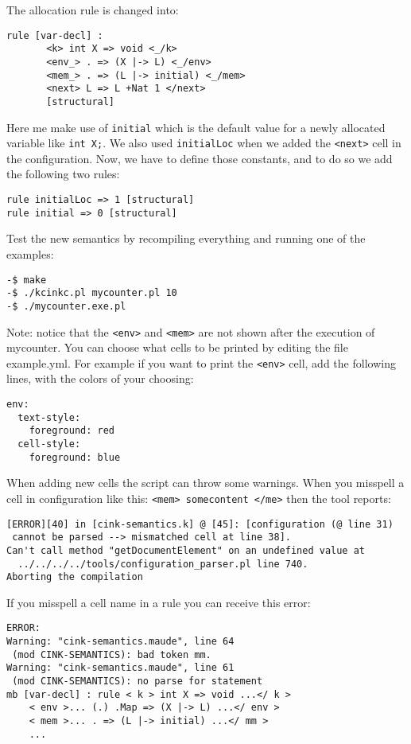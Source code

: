 \documentclass[11pt,a4paper]{article}
\begin{document}
\noindent The allocation rule is changed into:

\begin{verbatim}
rule [var-decl] :
       <k> int X => void <_/k>
       <env_> . => (X |-> L) <_/env>
       <mem_> . => (L |-> initial) <_/mem>
       <next> L => L +Nat 1 </next>
       [structural]
\end{verbatim}

\noindent Here me make use of \verb^initial^ which is the default value for a newly allocated variable like \verb^int X;^. We also used \verb^initialLoc^ when we added the \verb^<next>^ cell in the configuration. Now, we have to define those constants, and to do so we add the following two rules: 

\begin{verbatim}
rule initialLoc => 1 [structural]                                             
rule initial => 0 [structural] 
\end{verbatim}

Test the new semantics by recompiling everything and running one of the examples:

\begin{verbatim}
-$ make
-$ ./kcinkc.pl mycounter.pl 10
-$ ./mycounter.exe.pl
\end{verbatim}

Note: notice that the \verb^<env>^ and \verb^<mem>^ are not shown after the execution of mycounter. You can choose what cells to be printed by editing the file example.yml. For example if you want to print the \verb^<env>^ cell, add the following lines, with the colors of your choosing:

\begin{verbatim}
env:
  text-style:
    foreground: red
  cell-style:
    foreground: blue
\end{verbatim}

When adding new cells the script can throw some warnings. When you misspell a cell in configuration like this: \verb^<mem> somecontent </me>^ then the tool reports:

\begin{verbatim}
[ERROR][40] in [cink-semantics.k] @ [45]: [configuration (@ line 31)
 cannot be parsed --> mismatched cell at line 38].
Can't call method "getDocumentElement" on an undefined value at
  ../../../../tools/configuration_parser.pl line 740.
Aborting the compilation
\end{verbatim}

\noindent If you misspell a cell name in a rule you can receive this error:
\begin{verbatim}
ERROR:
Warning: "cink-semantics.maude", line 64 
 (mod CINK-SEMANTICS): bad token mm.
Warning: "cink-semantics.maude", line 61
 (mod CINK-SEMANTICS): no parse for statement
mb [var-decl] : rule < k > int X => void ...</ k >
    < env >... (.) .Map => (X |-> L) ...</ env >
    < mem >... . => (L |-> initial) ...</ mm >
    ...
\end{verbatim}
\end{document}
